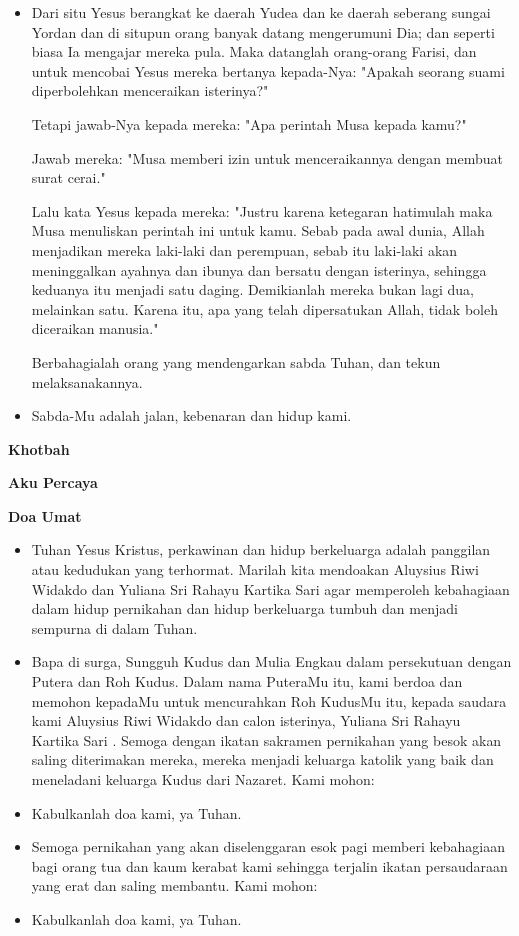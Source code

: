 \documentclass[a5paper,headsepline,titlepage,11pt,nnormalheadings]{scrartcl}
\makeatletter
\newcommand{\subjudul}[1]{%
  {\parindent \z@ \normalfont
    \interlinepenalty\@M \bfseries #1\par\nobreak \vskip 20\p@ }}
\newcommand{\BU}[1]{\begin{itemize} \item[U:] #1 \end{itemize}}
\newcommand{\BP}[1]{\begin{itemize} \item[P:] #1 \end{itemize}}
\newcommand{\camantri}{Yuliana Sri Rahayu Kartika Sari }
\newcommand{\camantra}{Aluysius Riwi Widakdo }
\makeatother
\begin{document}
\BP{
Dari situ Yesus berangkat ke daerah Yudea dan ke daerah seberang sungai Yordan dan di situpun orang banyak datang mengerumuni Dia; dan seperti biasa Ia mengajar mereka pula.
Maka datanglah orang-orang Farisi, dan untuk mencobai Yesus mereka bertanya kepada-Nya: "Apakah seorang suami diperbolehkan menceraikan isterinya?"

Tetapi jawab-Nya kepada mereka: "Apa perintah Musa kepada kamu?"

Jawab mereka: "Musa memberi izin untuk menceraikannya dengan membuat surat cerai."

Lalu kata Yesus kepada mereka: "Justru karena ketegaran hatimulah maka Musa menuliskan perintah ini untuk kamu.
Sebab pada awal dunia, Allah menjadikan mereka laki-laki dan perempuan,
sebab itu laki-laki akan meninggalkan ayahnya dan ibunya dan bersatu dengan isterinya,
sehingga keduanya itu menjadi satu daging. Demikianlah mereka bukan lagi dua, melainkan satu.
Karena itu, apa yang telah dipersatukan Allah, tidak boleh diceraikan manusia."

Berbahagialah orang yang mendengarkan sabda Tuhan, dan tekun melaksanakannya.}

\BU{Sabda-Mu adalah jalan, kebenaran dan hidup kami.}

\subjudul{Khotbah}

\subjudul{Aku Percaya}

\subjudul{Doa Umat}

\BP{Tuhan Yesus Kristus, perkawinan dan hidup berkeluarga adalah panggilan atau kedudukan yang terhormat. Marilah kita mendoakan \camantra dan \camantri agar memperoleh kebahagiaan dalam hidup pernikahan dan hidup berkeluarga tumbuh dan menjadi sempurna di dalam Tuhan.}

\BP{Bapa di surga, Sungguh Kudus dan Mulia Engkau dalam persekutuan dengan Putera dan Roh Kudus. Dalam nama PuteraMu itu, kami berdoa dan memohon kepadaMu untuk mencurahkan Roh KudusMu itu, kepada saudara kami \camantra dan calon isterinya, \camantri. Semoga dengan ikatan sakramen pernikahan yang besok akan saling diterimakan mereka, mereka menjadi keluarga katolik yang baik dan meneladani keluarga Kudus dari Nazaret. Kami mohon:}

\BU{Kabulkanlah doa kami, ya Tuhan.}

\BP{Semoga pernikahan yang akan diselenggaran esok pagi
memberi kebahagiaan bagi orang tua dan kaum kerabat kami sehingga terjalin
ikatan persaudaraan yang erat dan saling membantu. Kami mohon:}

\BU{Kabulkanlah doa kami, ya Tuhan.}
\end{document}
